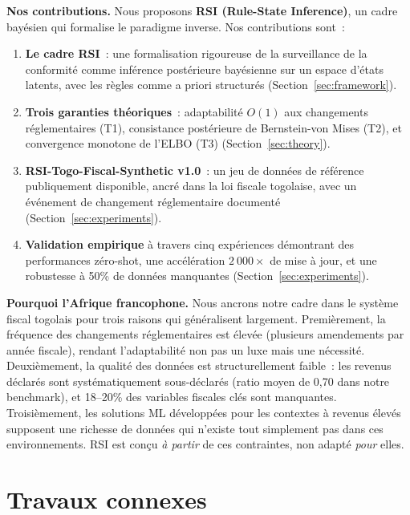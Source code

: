 \documentclass[letterpaper]{article}
\begin{document}
\medskip
\noindent\textbf{Nos contributions.}
Nous proposons \textbf{RSI (Rule-State Inference)}, un cadre bay\'esien
qui formalise le paradigme inverse. Nos contributions sont~:
\begin{enumerate}[leftmargin=2em, label=(\arabic*)]
  \item \textbf{Le cadre RSI}~: une formalisation rigoureuse de la
        surveillance de la conformit\'e comme inf\'erence post\'erieure
        bay\'esienne sur un espace d'\'etats latents, avec les r\`egles
        comme a priori structur\'es (Section~\ref{sec:framework}).
  \item \textbf{Trois garanties th\'eoriques}~: adaptabilit\'e $O(1)$
        aux changements r\'eglementaires (T1), consistance post\'erieure
        de Bernstein-von Mises (T2), et convergence monotone de l'ELBO
        (T3) (Section~\ref{sec:theory}).
  \item \textbf{RSI-Togo-Fiscal-Synthetic v1.0}~: un jeu de donn\'ees
        de r\'ef\'erence publiquement disponible, ancr\'e dans la loi
        fiscale togolaise, avec un \'ev\'enement de changement
        r\'eglementaire document\'e (Section~\ref{sec:experiments}).
  \item \textbf{Validation empirique} \`a travers cinq exp\'eriences
        d\'emontrant des performances z\'ero-shot, une acc\'el\'eration
        $2~000\times$ de mise \`a jour, et une robustesse \`a 50\% de
        donn\'ees manquantes (Section~\ref{sec:experiments}).
\end{enumerate}

\medskip
\noindent\textbf{Pourquoi l'Afrique francophone.}
Nous ancrons notre cadre dans le syst\`eme fiscal togolais pour trois
raisons qui g\'en\'eralisent largement. Premi\`erement, la fr\'equence
des changements r\'eglementaires est \'elev\'ee (plusieurs amendements
par ann\'ee fiscale), rendant l'adaptabilit\'e non pas un luxe mais
une n\'ecessit\'e. Deuxi\`emement, la qualit\'e des donn\'ees est
structurellement faible~: les revenus d\'eclar\'es sont syst\'ematiquement
sous-d\'eclar\'es (ratio moyen de 0,70 dans notre benchmark), et 18--20\%
des variables fiscales cl\'es sont manquantes. Troisi\`emement, les
solutions ML d\'evelopp\'ees pour les contextes \`a revenus \'elev\'es
supposent une richesse de donn\'ees qui n'existe tout simplement pas dans
ces environnements. RSI est con\c{c}u \emph{\`a partir} de ces contraintes,
non adapt\'e \emph{pour} elles.

\section{Travaux connexes}
\label{sec:related}
\end{document}
